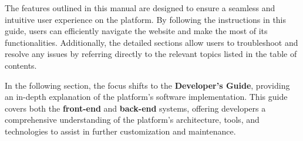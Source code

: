The features outlined in this manual are designed to ensure a seamless and intuitive user experience on the platform. By following the instructions in this guide, users can efficiently navigate the website and make the most of its functionalities. Additionally, the detailed sections allow users to troubleshoot and resolve any issues by referring directly to the relevant topics listed in the table of contents.

In the following section, the focus shifts to the \textbf{Developer's Guide}, providing an in-depth explanation of the platform's software implementation. This guide covers both the \textbf{front-end} and \textbf{back-end} systems, offering developers a comprehensive understanding of the platform's architecture, tools, and technologies to assist in further customization and maintenance.







